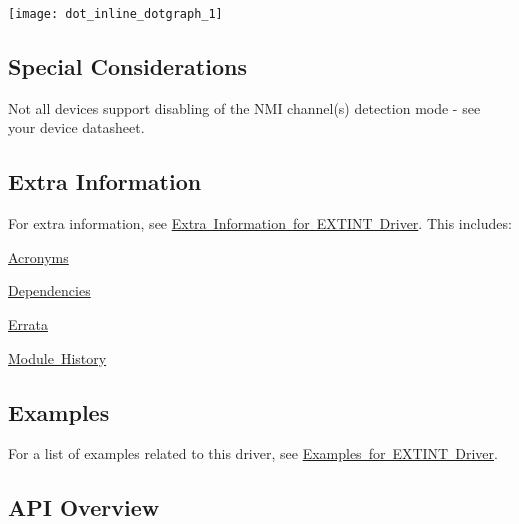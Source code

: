 \label{group__asfdoc__sam0__extint__group_asfdoc_sam0_extint_int_connections}%
%

\begin{DoxyImageNoCaption}
  \mbox{\texttt{[image: dot\_inline\_dotgraph\_1]}}
\end{DoxyImageNoCaption}
\hypertarget{group__asfdoc__sam0__extint__group_asfdoc_sam0_extint_special_considerations}{}\subsection{Special Considerations}\label{group__asfdoc__sam0__extint__group_asfdoc_sam0_extint_special_considerations}
Not all devices support disabling of the N\+MI channel(s) detection mode -\/ see your device datasheet.\hypertarget{group__asfdoc__sam0__extint__group_asfdoc_sam0_extint_extra_info}{}\subsection{Extra Information}\label{group__asfdoc__sam0__extint__group_asfdoc_sam0_extint_extra_info}
For extra information, see \mbox{\hyperlink{asfdoc_sam0_extint_extra}{Extra Information for E\+X\+T\+I\+NT Driver}}. This includes\+:
\begin{DoxyItemize}
\item \mbox{\hyperlink{asfdoc_sam0_extint_extra_asfdoc_sam0_extint_extra_acronyms}{Acronyms}}
\item \mbox{\hyperlink{asfdoc_sam0_extint_extra_asfdoc_sam0_extint_extra_dependencies}{Dependencies}}
\item \mbox{\hyperlink{asfdoc_sam0_extint_extra_asfdoc_sam0_extint_extra_errata}{Errata}}
\item \mbox{\hyperlink{asfdoc_sam0_extint_extra_asfdoc_sam0_extint_extra_history}{Module History}}
\end{DoxyItemize}\hypertarget{group__asfdoc__sam0__extint__group_asfdoc_sam0_extint_examples}{}\subsection{Examples}\label{group__asfdoc__sam0__extint__group_asfdoc_sam0_extint_examples}
For a list of examples related to this driver, see \mbox{\hyperlink{asfdoc_sam0_extint_exqsg}{Examples for E\+X\+T\+I\+NT Driver}}.\hypertarget{group__asfdoc__sam0__extint__group_asfdoc_sam0_extint_api_overview}{}\subsection{A\+P\+I Overview}\label{group__asfdoc__sam0__extint__group_asfdoc_sam0_extint_api_overview}


